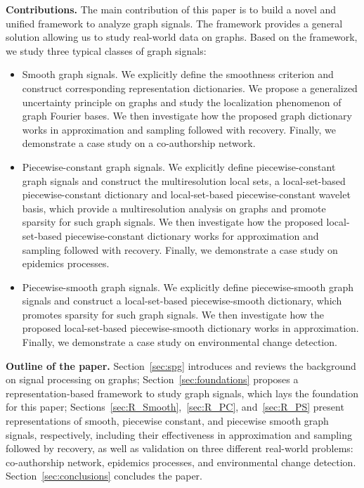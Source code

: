 \documentclass[journal,twocolumn,10pt]{IEEEtran}
\theoremstyle{definition}
\newcommand{\mypar}[1]{{\bf #1.}}
\begin{document}
\mypar{Contributions}  The main contribution of this
  paper is to build a novel and unified framework to analyze graph signals. The framework provides a general solution allowing us to study real-world data on graphs. Based on the framework, we study three typical classes of graph signals:
  
 \begin{itemize}
 \item Smooth graph signals. We explicitly define the smoothness criterion and construct corresponding representation dictionaries. We propose a generalized uncertainty principle on graphs and study the localization phenomenon of graph Fourier bases. We then investigate how the proposed graph dictionary works in approximation and sampling followed with recovery. Finally, we demonstrate a case study on a co-authorship network.
 
  \item Piecewise-constant graph signals. We explicitly define piecewise-constant graph signals and construct the multiresolution local sets, a local-set-based piecewise-constant  dictionary and local-set-based piecewise-constant wavelet basis, which provide a multiresolution analysis on graphs and promote sparsity for  such graph signals.  We then investigate how the proposed local-set-based piecewise-constant  dictionary works for approximation and sampling followed with recovery. Finally, we demonstrate a case study on epidemics processes.

   \item  Piecewise-smooth graph signals. We explicitly define  piecewise-smooth graph signals and construct a local-set-based piecewise-smooth  dictionary, which promotes sparsity for  such graph signals.  We then investigate how the proposed local-set-based piecewise-smooth dictionary works in approximation. Finally, we demonstrate a case study on environmental change detection.
\end{itemize}  

\mypar{Outline of the paper} Section~\ref{sec:spg} introduces and reviews the background on signal processing on graphs; Section~\ref{sec:foundations} proposes a representation-based framework to study graph signals, which lays the foundation for this paper; Sections~\ref{sec:R_Smooth},~\ref{sec:R_PC}, and~\ref{sec:R_PS} present representations of smooth, piecewise constant, and piecewise smooth graph signals, respectively, including their effectiveness in approximation and sampling followed by recovery, as well as validation on three different real-world problems: co-authorship network, epidemics processes, and environmental change detection. Section~\ref{sec:conclusions} concludes the paper.
\end{document}
